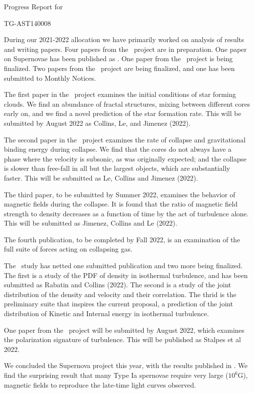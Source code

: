 \documentclass[11pt]{NSF}  %
\begin{document}
\begin{centering}
\begin{LARGE}
Progress Report for

TG-AST140008

\end{LARGE}
\end{centering}


\pagestyle{plain}

During our 2021-2022 allocation we have primarily worked on analysis of results and writing papers.
Four papers
from the \nameCores\ project are in preparation.
One paper on Supernovae has been published as \citep{Hristov21}.
One paper from the \nameCMB\ project is being finalized.  Two papers from the
\nameTurbulence\ project are being finalized, and one has been submitted to
Monthly Notices.  

The first paper in the \nameCores\ project examines the initial conditions 
of star forming clouds.  We find an abundance of fractal structures, mixing
between different cores early on, and we find a novel prediction of the star
formation rate.  This will be submitted by August 2022 as Collins, Le, and
Jimenez (2022).

The second paper in the \nameCores\ project examines the rate of collapse and
gravitational binding energy during collapse.
  We find that the cores do not always have a
phase where the velocity is subsonic, as was originally expected; and the
collapse is slower than free-fall in all but the largest objects, which are
substantially faster.  This will be submitted as Le, Collins and Jimenez (2022).

The third paper, to be submitted by Summer 2022,
examines the behavior of magnetic fields during the collapse.   It is found that
the ratio of magnetic field strength to density decreases as a function of time
by the act of turbulence alone.  This will be submitted as Jimenez, Collins and
Le (2022).

The fourth publication, to be completed by Fall 2022, is an examination of the
full suite of forces acting on collapsing gas.  

The \nameTurbulence\ study has netted one submitted publication and two more
being finalized.  The first is a study of the PDF of density in isothermal
turbulence, and has been submitted as Rabatin and Collins (2022).  The second is
a study of the joint distribution of the density and velocity and their
correlation.  The thrid is the preliminary suite that inspires the current
proposal, a prediction of the joint distribution of Kinetic and Internal energy
in isothermal turbulence.  

One paper from the \nameCMB\ project will be submitted by August 2022, which
examines the polarization signature of turbulence.  This will be published as
Stalpes et al 2022.

We concluded the Supernova project this year, with the results published
in \citep{Hristov21}.  We find the surprising result that many Type Ia spernovae
require very large ($10^6$G), magnetic fields to reproduce the late-time light
curves observed.  


\end{document}
